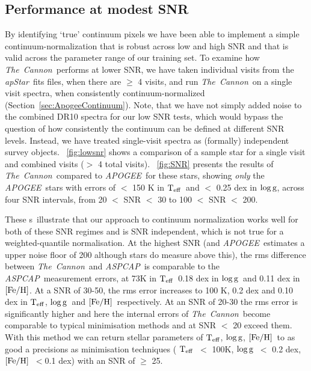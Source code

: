 \documentclass[12pt, preprint]{aastex}
\newcommand{\sectionname}{Section}
\newcommand{\figurenames}{\figurename s}
\newcommand{\tc}{\textsl{The~Cannon}}
\newcommand{\apogee}{\textsl{APOGEE}}
\newcommand{\aspcap}{\textsl{ASPCAP}}
\newcommand{\apstar}{\textsl{apStar}}
\newcommand{\teff}{\mbox{$\rm T_{eff}$}}
\newcommand{\feh}{\mbox{$\rm [Fe/H]$}}
\newcommand{\logg}{\mbox{$\rm \log g$}}
\begin{document}
 \subsection{Performance at modest SNR}
 \label{sec:lowSNR}


By identifying `true' continuum pixels we have been able to implement a simple continuum-normalization that is robust across low and high SNR and that is valid across the parameter range of our training set. To examine how \tc\ performs at lower SNR, we have taken individual visits from the \apstar\ fits files, when there are $\ge$ 4 visits, and run \tc\ on a single visit spectra, when consistently continuum-normalized (\sectionname~\ref{sec:ApogeeContinuum}). Note, that we have not simply added noise to the combined DR10 spectra for our low SNR tests, which would bypass the question of how consistently the continuum can be defined at different SNR levels. Instead, we have treated single-visit spectra as (formally) independent survey objects. \figurename~\ref{fig:lowsnr} shows a comparison of a sample star for a single visit and combined visits ($>$ 4 total visits). \figurename~\ref{fig:SNR} presents the results of \tc\ compared to \apogee\ for these stars, showing \textit{only} the \apogee\ stars with errors of $<$ 150 K in \teff\ and $<$ 0.25 dex in \logg, across four SNR intervals, from 20 $<$ SNR $<$ 30 to 100 $<$ SNR $<$ 200.

These \figurenames\ illustrate that our approach to continuum normalization works well for both of these SNR regimes and is SNR independent, which is not true for a weighted-quantile normalisation. At the highest SNR (and \apogee\ estimates a upper noise floor of 200 although stars do measure above this), the rms difference between \tc\ and \aspcap\ is comparable to the \aspcap\ measurement errors, at 73K in \teff\, 0.18 dex in \logg\ and 0.11 dex in \feh. At a SNR of 30-50, the rms error increases to 100 K, 0.2 dex and 0.10 dex in \teff, \logg\ and \feh\, respectively. At an SNR of 20-30 the rms error is significantly higher and here the internal errors of \tc\ become comparable to typical minimisation methods and at SNR $<$ 20 exceed them. With this method we can return stellar parameters of \teff, \logg, \feh\ to as good a precisions as minimisation techniques ( \teff\ $<$ 100K, \logg\ $<$ 0.2 dex, \feh\ $< $0.1 dex) with an SNR of $\ge$ 25. 
 
\end{document}
